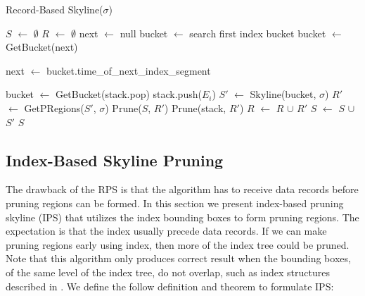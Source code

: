 \begin{algorithm}[!h]
\caption{Record-Based Skyline($\sigma$)} \label{alg:RBSkyline}
\begin{algorithmic}[1]

\STATE $S$ $\gets$ $\emptyset$
\STATE $R$ $\gets$ $\emptyset$
\REPEAT
    \STATE next $\gets$ null
        \STATE bucket $\gets$ search first index bucket
    \ELSE
        \STATE bucket $\gets$ GetBucket(next)
    \ENDIF

        \STATE next $\gets$ bucket.time\_of\_next\_index\_segment
    \ENDIF

            \STATE bucket $\gets$ GetBucket(stack.pop)
        \ENDIF
                    \STATE stack.push($E_i$)
                \ENDIF
            \ENDFOR
        \ELSE
            \STATE $S'$ $\gets$ Skyline(bucket, $\sigma$)
            \STATE $R'$ $\gets$ GetPRegions($S'$, $\sigma$)
            \STATE Prune($S$, $R'$)
            \STATE Prune(stack, $R'$)
            \STATE $R$ $\gets$ $R$ $\cup$ $R'$
            \STATE $S$ $\gets$ $S$ $\cup$ $S'$
        \ENDIF
    \ENDWHILE
{}
\RETURN $S$
\end{algorithmic}
\end{algorithm}


\subsection{Index-Based Skyline Pruning}\label{sec-IPS}

The drawback of the RPS is that the algorithm has to receive data records before pruning regions can be formed. In this section we present index-based pruning skyline (IPS) that utilizes the index bounding boxes to form pruning regions. The expectation is that the index usually precede data records. If we can make pruning regions early using index, then more of the index tree could be pruned. Note that this algorithm only produces correct result when the bounding boxes, of the same level of the index tree, do not overlap, such as index structures described in \cite{DBLP:conf/vldb/SellisRF87}\cite{DBLP:journals/acta/FinkelB74}\cite{DBLP:conf/compgeom/Bentley90}. We define the follow definition and theorem to formulate IPS:

